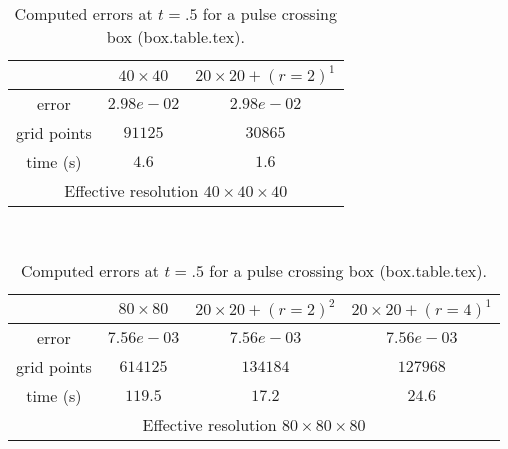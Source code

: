 \begin{table}[hbt]
\footnotesize
\begin{center}
\begin{tabular}{|c|c|c|}  \hline 
            & $40\times 40$  & $20\times20+ (r=2)^1$  \\   \hline 
 error      & $2.98e-02$     & $2.98e-02$  \\  
grid points & $91125$   &   $30865$     \\ 
time (s)    & $4.6$   &  $1.6$      \\ 
 \hline 
 \multicolumn{3}{c}{Effective resolution $40\times40\times40$} \\ 
 \end{tabular}  \\ 
\vspace{.25\baselineskip}
\begin{tabular}{|c|c|c|c|}                   \hline 
       &  $80\times 80$ & $20\times20+ (r=2)^2$ & $20\times20+ (r=4)^1$  \\   \hline 
 error       & $7.56e-03$      & $7.56e-03$  & $7.56e-03$  \\  
 grid points &  $614125$  &  $134184$      &  $ 127968$      \\ 
 time (s)    &    $119.5$        &   $17.2$           &  $24.6$   \\ 
  \hline 
 \multicolumn{4}{c}{Effective resolution $80\times80\times80$}  \\   
 \end{tabular}  
 \end{center}  
 \caption{Computed errors at $t=.5$ for a pulse crossing box (box.table.tex).}  
 \label{tab:amrh.box}  
 \end{table}  
